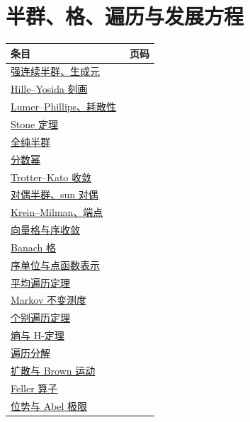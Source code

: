 \section*{半群、格、遍历与发展方程}
\begin{longtable}{p{0.80\linewidth}r}
\toprule 条目 & 页码\\\midrule\endhead
\hyperref[sec:yosida-09-03]{强连续半群、生成元} & \pageref{sec:yosida-09-03}\\
\hyperref[sec:yosida-09-07]{Hille--Yosida 刻画} & \pageref{sec:yosida-09-07}\\
\hyperref[sec:yosida-09-08]{Lumer--Phillips、耗散性} & \pageref{sec:yosida-09-08}\\
\hyperref[sec:yosida-09-09]{Stone 定理} & \pageref{sec:yosida-09-09}\\
\hyperref[sec:yosida-09-10]{全纯半群} & \pageref{sec:yosida-09-10}\\
\hyperref[sec:yosida-09-11]{分数幂} & \pageref{sec:yosida-09-11}\\
\hyperref[sec:yosida-09-12]{Trotter--Kato 收敛} & \pageref{sec:yosida-09-12}\\
\hyperref[sec:yosida-09-13]{对偶半群、sun 对偶} & \pageref{sec:yosida-09-13}\\
\hyperref[sec:yosida-12-01]{Krein--Milman、端点} & \pageref{sec:yosida-12-01}\\
\hyperref[sec:yosida-12-02]{向量格与序收敛} & \pageref{sec:yosida-12-02}\\
\hyperref[sec:yosida-12-03]{Banach 格} & \pageref{sec:yosida-12-03}\\
\hyperref[sec:yosida-12-05]{序单位与点函数表示} & \pageref{sec:yosida-12-05}\\
\hyperref[sec:yosida-08-03]{平均遍历定理} & \pageref{sec:yosida-08-03}\\
\hyperref[sec:yosida-13-01]{Markov 不变测度} & \pageref{sec:yosida-13-01}\\
\hyperref[sec:yosida-13-02]{个别遍历定理} & \pageref{sec:yosida-13-02}\\
\hyperref[sec:yosida-13-03]{熵与 H-定理} & \pageref{sec:yosida-13-03}\\
\hyperref[sec:yosida-13-04]{遍历分解} & \pageref{sec:yosida-13-04}\\
\hyperref[sec:yosida-13-05]{扩散与 Brown 运动} & \pageref{sec:yosida-13-05}\\
\hyperref[sec:yosida-13-06]{Feller 算子} & \pageref{sec:yosida-13-06}\\
\hyperref[sec:yosida-13-09]{位势与 Abel 极限} & \pageref{sec:yosida-13-09}\\

\end{longtable}

